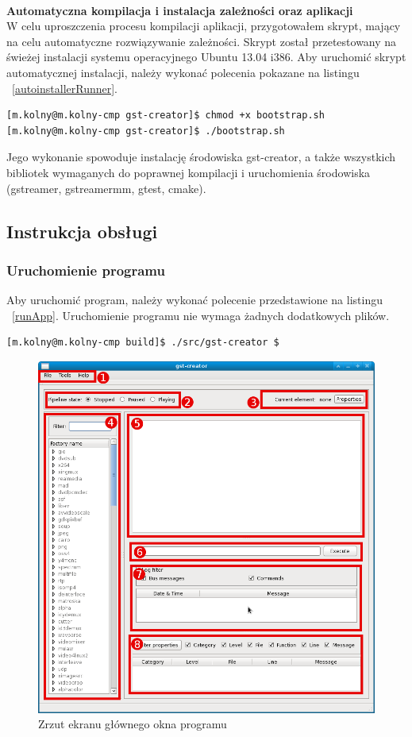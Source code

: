 \documentclass[12pt]{article}
\begin{document}
\paragraph{}
\textbf{Automatyczna kompilacja i instalacja zależności oraz aplikacji}\\
W celu uproszczenia procesu kompilacji aplikacji, przygotowałem skrypt, mający na celu automatyczne rozwiązywanie zależności. Skrypt został przetestowany na świeżej instalacji systemu operacyjnego Ubuntu 13.04 i386. Aby uruchomić skrypt automatycznej instalacji, należy wykonać polecenia pokazane na listingu ~\ref{autoinstallerRunner}.
\begin{lstlisting}[caption=Uruchomienie skryptu autoinstalatora, label=autoinstallerRunner]
[m.kolny@m.kolny-cmp gst-creator]$ chmod +x bootstrap.sh
[m.kolny@m.kolny-cmp gst-creator]$ ./bootstrap.sh
\end{lstlisting}
Jego wykonanie spowoduje instalację środowiska gst-creator, a także wszystkich bibliotek wymaganych do poprawnej kompilacji i uruchomienia środowiska (gstreamer, gstreamermm, gtest, cmake).
\subsection{Instrukcja obsługi}
\subsubsection{Uruchomienie programu}
Aby uruchomić program, należy wykonać polecenie przedstawione na listingu ~\ref{runApp}. Uruchomienie programu nie wymaga żadnych dodatkowych plików.
\begin{lstlisting}[caption=Uruchomienie programu, label=runApp]
[m.kolny@m.kolny-cmp build]$ ./src/gst-creator $
\end{lstlisting} 
\begin{figure}[H]
  \includegraphics[width=155mm]{img/main-window.png}
  \caption{Zrzut ekranu głównego okna programu}
  \label{fig:mainWindow}
\end{figure}
\end{document}

